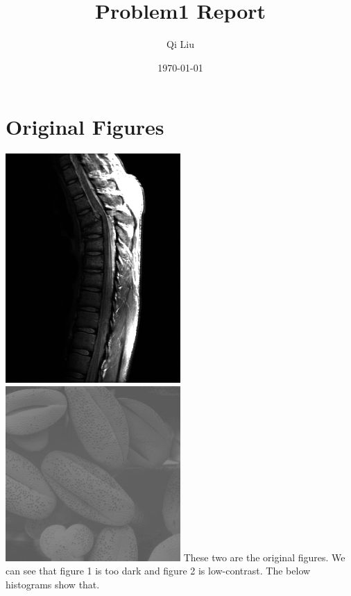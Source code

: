 \documentclass{article}
\title{Problem1 Report}
\author{Qi Liu}
\date{\today}
\begin{document}
	
\maketitle

\section{Original Figures}
\includegraphics[width=0.5\textwidth]{../data/Fig1.jpg}
\includegraphics[width=0.5\textwidth]{../data/Fig2.jpg}
These two are the original figures. We can see that figure 1 is too dark and figure 2 is low-contrast. The below histograms show that.
\end{document}
